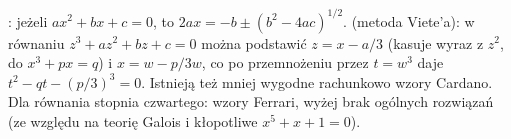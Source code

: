 :  jeżeli $ax^2 + bx + c = 0$, to $2ax = -b \pm (b^2 - 4ac)^{1/2}$.
 (metoda Viete'a): w równaniu $z^3 +az^2 + bz + c = 0$ można podstawić $z = x - a/3$ (kasuje wyraz z $z^2$, do $x^3 + px = q$) i $x = w - p / 3w$, co po przemnożeniu przez $t = w^3$ daje $t^2 - qt - (p/3)^3 = 0$.
Istnieją też mniej wygodne rachunkowo wzory Cardano.
Dla równania stopnia czwartego: wzory Ferrari, wyżej brak ogólnych rozwiązań (ze względu na teorię Galois i kłopotliwe $x^5 + x + 1 = 0$).